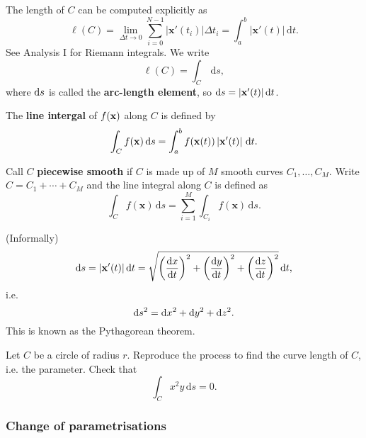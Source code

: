 \begin{definition}
    The length of $C$ can be computed explicitly as 
    \[
        \ell (C) = \lim_{\Delta t \to 0} \sum_{i=0}^{N-1} \left| \mathbf{x}'(t_i) \right| \Delta t_i = \int_{a}^{b} \left| \mathbf{x}'(t) \right|  \,\mathrm{d}t.
    \]
    See Analysis I for Riemann integrals. We write 
    \[
        \ell (C) = \int_{C} \,\mathrm{d}s,
    \]
    where $ \mathrm{d} s $ is called the \textbf{arc-length element}, so $ \mathrm{d} s = |\mathbf{x}'(t)| \,\mathrm{d} t $.
\end{definition}
\begin{definition}
    The \textbf{line intergal} of $f({\bf x})$ along $C$ is defined by 
    \[
        \int_{C} f(\mathbf{x}) \,\mathrm{d}s = \int_{a}^{b} f(\mathbf{x}(t)) \left| {\bf x}'(t) \right| \,\mathrm{d}t.
    \]
\end{definition}
\begin{definition}
    Call $C$ \textbf{piecewise smooth} if $C$ is made up of $M$ smooth curves $ C_1,\dots,C_M $. Write $C=C_1+\cdots+C_M$ and the line integral along $C$ is defined as 
    \[
        \int_{C} f(\mathbf{x}) \,\mathrm{d}s = \sum_{i=1}^{M}\int_{C_i} f(\mathbf{x}) \,\mathrm{d}s.
    \]
\end{definition}
\begin{note}
    (Informally) 
    \[
        \mathrm{d} s = |\mathbf{x}'(t)|\,\mathrm{d} t = \sqrt{\left( \frac{\mathrm{d}x}{\mathrm{d}t}  \right)^2+\left(\frac{\mathrm{d}y}{\mathrm{d}t}  \right)^2+\left(\frac{\mathrm{d}z}{\mathrm{d}t}  \right)^2}\,\mathrm{d} t,
    \]
    i.e.
    \[
        \mathrm{d} s^2 = \mathrm{d} x^2+\mathrm{d} y^2+\mathrm{d} z^2.
    \]
    This is known as the Pythagorean theorem.
\end{note}
\begin{example}
    Let $C$ be a circle of radius $r$. Reproduce the process to find the curve length of $C$, i.e. the parameter. Check that 
    \[
        \int_{C} x^2y \,\mathrm{d}s = 0.
    \]
\end{example}

\subsubsection*{Change of parametrisations}


